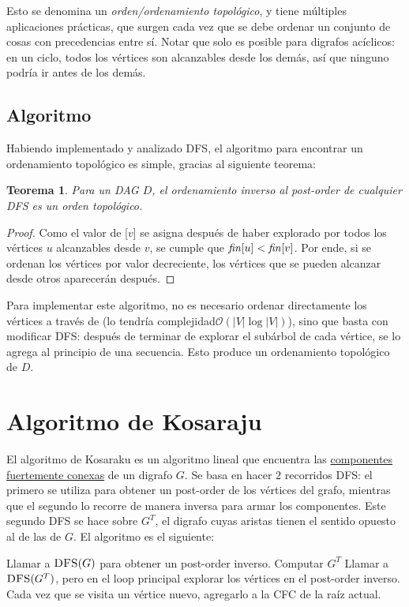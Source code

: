 \documentclass[a4paper]{report}
\newcommand{\BigO}[1]{\ensuremath{\mathcal{O}(#1)}}
\newtheorem*{theorem*}{Teorema}
\begin{document}
Esto se denomina un \textit{orden/ordenamiento topológico}, y tiene múltiples aplicaciones prácticas, que surgen cada vez que se debe ordenar un conjunto de cosas con precedencias entre sí. Notar que solo es posible para digrafos acíclicos: en un ciclo, todos los vértices son alcanzables desde los demás, así que ninguno podría ir antes de los demás.

\subsection{Algoritmo}

Habiendo implementado y analizado DFS, el algoritmo para encontrar un ordenamiento topológico es simple, gracias al siguiente teorema:

\begin{theorem*}
    Para un DAG $D$, el ordenamiento inverso al post-order de cualquier DFS es un orden topológico.
\end{theorem*}
\begin{proof}
    Como el valor de [$v$] se asigna después de haber explorado por todos los vértices $u$ alcanzables desde $v$, se cumple que $\id{fin}[u] < \id{fin}[v]$. Por ende, si se ordenan los vértices por valor  decreciente, los vértices que se pueden alcanzar desde otros aparecerán después.
\end{proof}

Para implementar este algoritmo, no es necesario ordenar directamente los vértices a través de  (lo tendría complejidad\BigO{|V|\log{|V|}}), sino que basta con modificar DFS: después de terminar de explorar el subárbol de cada vértice, se lo agrega al principio de una secuencia. Esto produce un ordenamiento topológico de $D$.

\section{Algoritmo de Kosaraju}

El algoritmo de Kosaraku es un algoritmo lineal que encuentra las \hyperref[recorridos-digrafos]{componentes fuertemente conexas} de un digrafo $G$. Se basa en hacer $2$ recorridos DFS: el primero se utiliza para obtener un post-order de los vértices del grafo, mientras que el segundo lo recorre de manera inversa para armar los componentes. Este segundo DFS se hace sobre $G^T$, el digrafo cuyas aristas tienen el sentido opuesto al de las de $G$. El algoritmo es el siguiente:

\begin{codebox}
    \li Llamar a $\textnormal{\scshape DFS}(G)$ para obtener un post-order inverso.
    \li Computar $G^T$
    \li Llamar a $\textnormal{\scshape DFS}(G^T)$, pero en el loop principal explorar los vértices en el post-order inverso.
    \zi Cada vez que se visita un vértice nuevo, agregarlo a la CFC de la raíz actual.
\end{codebox}
\end{document}
